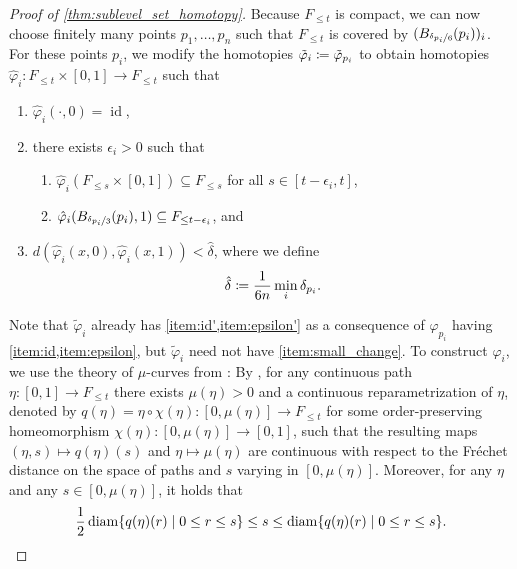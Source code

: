 \begin{proof}[Proof of \cref{thm:sublevel_set_homotopy}]
	Because $F_{\leq t}$ is compact, we can now choose finitely many points $p_{1}, \dots, p_{n}$ such that $F_{\leq t}$ is covered by $( B_{\nicefrac{\delta_{p_{i}}}{6}}(p_{i}))_{i}$.
	For these points $p_{i}$, we modify the homotopies $\tilde{\varphi}_{i} \coloneqq \tilde{\varphi}_{p_{i}}$ to obtain homotopies $\hat{\varphi}_{i} \colon F_{\leq t} \times [0,1] \to F_{\leq t}$ such that
	\begin{enumerate}[label={(\arabic*')}]
		\item \label{item:id'} $\hat{\varphi}_{i}(\cdot,0) = \operatorname{id}$,
		\item \label{item:epsilon'} there exists $\epsilon_{i} > 0$ such that
		\begin{enumerate}[label={(\alph*)}, ref={(\arabic{enumi}'\alph*)}]
			\item \label{item:s_below_s'} $\hat{\varphi}_{i}(F_{\leq s} \times [0,1]) \subseteq F_{\leq s}$ for all $s \in [t - \epsilon_{i}, t]$,
			\item \label{item:contracting'} $\hat{\varphi}_{i}(B_{\nicefrac{\delta_{p_{i}}}{3}}(p_{i}), 1) \subseteq F_{\leq t - \epsilon_{i}}$, and
		\end{enumerate}
		\item \label{item:small_change} $d(\hat{\varphi}_{i}(x, 0), \hat{\varphi}_{i}(x,1)) < \hat{\delta}$,
			where we define
			\[
				\hat{\delta} \coloneqq \frac{1}{6n} \min_{i} \delta_{p_{i}}.
			\]
	\end{enumerate}
	Note that $\tilde{\varphi}_{i}$ already has \cref{item:id',item:epsilon'} as a consequence of $\varphi_{p_{i}}$ having \cref{item:id,item:epsilon}, but $\tilde{\varphi}_{i}$ need not have \cref{item:small_change}.
	To construct $\hat{\varphi}_{i}$, we use the theory of $\mu$-curves from \cite{Morse.1936}:
	By \cite{Morse.1936}, for any continuous path $\eta \colon [0,1] \to F_{\leq t}$ there exists $\mu(\eta) > 0$ and a continuous reparametrization of $\eta$, denoted by $q(\eta) = \eta \circ \chi(\eta) \colon [0, \mu(\eta)] \to F_{\leq t}$ for some order-preserving homeomorphism $\chi(\eta) \colon [0, \mu(\eta)] \to [0,1]$, such that the resulting maps $(\eta,s) \mapsto q(\eta)(s)$ and $\eta \mapsto \mu(\eta)$ are continuous with respect to the Fr\'echet distance on the space of paths and $s$ varying in $[0, \mu(\eta)]$.
	Moreover, for any $\eta$ and any $s \in [0, \mu(\eta)]$, it holds that
	\begin{equation}\label{eq:mu_param}
		\frac{1}{2}\diam\{q(\eta)(r) \mid 0 \leq r \leq s\} \leq s \leq \diam\{q(\eta)(r) \mid 0 \leq r \leq s\}.

\end{equation}
\end{proof}
